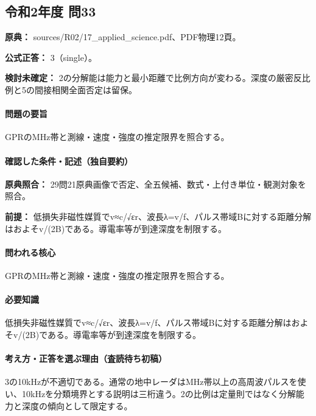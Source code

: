 \subsection{令和2年度 問33}
\label{q:r02-reg-applied-33}

\noindent\textbf{原典：} sources/R02/17\_applied\_science.pdf、PDF物理12頁。

\textbf{公式正答：} 3（single）。

\par\textbf{検討未確定：} 2の分解能は能力と最小距離で比例方向が変わる。深度の厳密反比例と5の間接相関全面否定は留保。

\paragraph{問題の要旨} GPRのMHz帯と測線・速度・強度の推定限界を照合する。

\paragraph{確認した条件・記述（独自要約）}\mbox{}\par

\noindent\textbf{原典照合：} 29問21原典画像で否定、全五候補、数式・上付き単位・観測対象を照合。\par

\noindent\textbf{前提：} 低損失非磁性媒質でv≈c/√εr、波長λ=v/f、パルス帯域Bに対する距離分解はおよそv/(2B)である。導電率等が到達深度を制限する。\par

\paragraph{問われる核心} GPRのMHz帯と測線・速度・強度の推定限界を照合する。

\paragraph{必要知識} 低損失非磁性媒質でv≈c/√εr、波長λ=v/f、パルス帯域Bに対する距離分解はおよそv/(2B)である。導電率等が到達深度を制限する。

\paragraph{考え方・正答を選ぶ理由（査読待ち初稿）} 3の10kHzが不適切である。通常の地中レーダはMHz帯以上の高周波パルスを使い、10kHzを分類境界とする説明は三桁違う。2の比例は定量則ではなく分解能力と深度の傾向として限定する。

